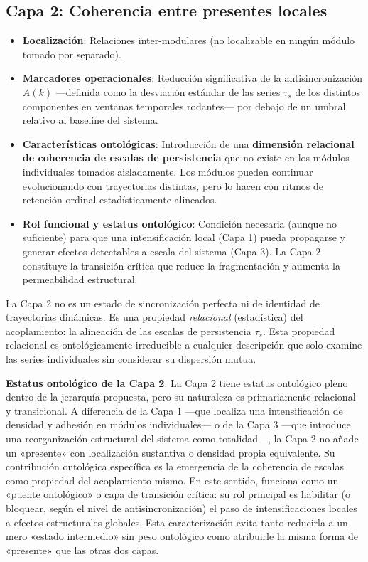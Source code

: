 \subsection{Capa 2: Coherencia entre presentes locales}

\begin{itemize}
    \item \textbf{Localización}: Relaciones inter-modulares (no localizable en ningún módulo tomado por separado).
    \item \textbf{Marcadores operacionales}: Reducción significativa de la antisincronización $A(k)$ —definida como la desviación estándar de las series $\tau_s$ de los distintos componentes en ventanas temporales rodantes— por debajo de un umbral relativo al baseline del sistema.
    \item \textbf{Características ontológicas}: Introducción de una \textbf{dimensión relacional de coherencia de escalas de persistencia} que no existe en los módulos individuales tomados aisladamente. Los módulos pueden continuar evolucionando con trayectorias distintas, pero lo hacen con ritmos de retención ordinal estadísticamente alineados.
    \item \textbf{Rol funcional y estatus ontológico}: Condición necesaria (aunque no suficiente) para que una intensificación local (Capa 1) pueda propagarse y generar efectos detectables a escala del sistema (Capa 3). La Capa 2 constituye la transición crítica que reduce la fragmentación y aumenta la permeabilidad estructural.
\end{itemize}

La Capa 2 no es un estado de sincronización perfecta ni de identidad de trayectorias dinámicas. Es una propiedad \textit{relacional} (estadística) del acoplamiento: la alineación de las escalas de persistencia $\tau_s$. Esta propiedad relacional es ontológicamente irreducible a cualquier descripción que solo examine las series individuales sin considerar su dispersión mutua.

\textbf{Estatus ontológico de la Capa 2}. La Capa 2 tiene estatus ontológico pleno dentro de la jerarquía propuesta, pero su naturaleza es primariamente relacional y transicional. A diferencia de la Capa 1 —que localiza una intensificación de densidad y adhesión en módulos individuales— o de la Capa 3 —que introduce una reorganización estructural del sistema como totalidad—, la Capa 2 no añade un «presente» con localización sustantiva o densidad propia equivalente. Su contribución ontológica específica es la emergencia de la coherencia de escalas como propiedad del acoplamiento mismo. En este sentido, funciona como un «puente ontológico» o capa de transición crítica: su rol principal es habilitar (o bloquear, según el nivel de antisincronización) el paso de intensificaciones locales a efectos estructurales globales. Esta caracterización evita tanto reducirla a un mero «estado intermedio» sin peso ontológico como atribuirle la misma forma de «presente» que las otras dos capas.

